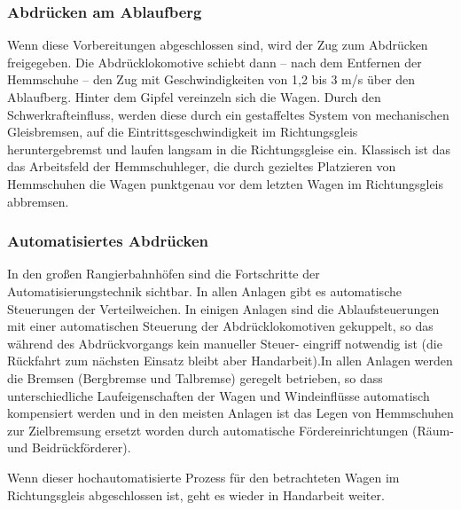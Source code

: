 \subsubsection{Abdrücken am Ablaufberg}\label{sec:Abdruecken}
Wenn diese Vorbereitungen abgeschlossen sind, wird der Zug zum Abdrücken freigegeben. Die Abdrücklokomotive schiebt dann -- nach dem Entfernen der Hemmschuhe -- den Zug mit Geschwindigkeiten von 1,2 bis 3 m/s %
über den \gls{Ablaufberg}. Hinter dem Gipfel vereinzeln sich die Wagen. Durch den Schwerkrafteinfluss, werden diese durch ein gestaffeltes System von mechanischen Gleisbremsen, auf die Eintrittsgeschwindigkeit im Richtungsgleis heruntergebremst und laufen langsam in die Richtungsgleise ein.  Klassisch ist das das Arbeitsfeld der Hemmschuhleger, die durch gezieltes Platzieren von Hemmschuhen die Wagen punktgenau vor dem letzten Wagen im Richtungsgleis abbremsen.
\subsubsection{Automatisiertes Abdrücken}\label{sec:automAbdruecken}
In den großen Rangierbahnhöfen sind die Fortschritte der Automatisierungstechnik sichtbar. In allen Anlagen gibt es automatische Steuerungen der Verteilweichen. In einigen Anlagen sind die Ablaufsteuerungen mit einer automatischen Steuerung der Abdrücklokomotiven gekuppelt, so das während des Abdrückvorgangs kein manueller Steuer- eingriff notwendig ist (die Rückfahrt zum nächsten Einsatz bleibt aber Handarbeit).In allen Anlagen werden die Bremsen (Bergbremse und Talbremse) geregelt betrieben, so dass unterschiedliche Laufeigenschaften der Wagen und Windeinflüsse automatisch kompensiert werden und in den meisten Anlagen ist das Legen von Hemmschuhen zur Zielbremsung ersetzt worden durch automatische Fördereinrichtungen (Räum- und Beidrückförderer).\par
Wenn dieser hochautomatisierte Prozess für den betrachteten Wagen im Richtungsgleis abgeschlossen ist, geht es wieder in Handarbeit weiter.
